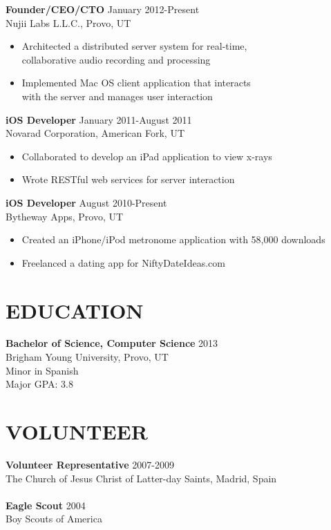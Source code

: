 \documentclass[margin]{res}
\begin{document}
\begin{resume}
      {\bf Founder/CEO/CTO} \hfill January 2012-Present \\
      Nujii Labs L.L.C., Provo, UT 
      \begin{itemize} \itemsep -2pt
          \item Architected a distributed server system for real-time, \\
          collaborative audio recording and processing
          \item Implemented Mac OS client application that interacts \\
          with the server and manages user interaction
      \end{itemize}

      {\bf iOS Developer} \hfill January 2011-August 2011 \\
      Novarad Corporation, American Fork, UT  
      \begin{itemize} \itemsep -2pt
          \item Collaborated to develop an iPad application to view x-rays
          \item Wrote RESTful web services for server interaction
      \end{itemize}

      {\bf iOS Developer} \hfill  August 2010-Present \\
      Bytheway Apps, Provo, UT
      \begin{itemize} \itemsep -2pt
          \item Created an iPhone/iPod metronome application with 58,000 downloads
          \item Freelanced a dating app for NiftyDateIdeas.com
      \end{itemize}

    \section{EDUCATION}
      {\bf Bachelor of Science, Computer Science} \hfill 2013 \\
      Brigham Young University, Provo, UT                 \\
      Minor in Spanish                                    \\
      Major GPA: 3.8

    \section{VOLUNTEER}
      {\bf Volunteer Representative} \hfill 2007-2009 \\
      The Church of Jesus Christ of Latter-day Saints, Madrid, Spain \\ \\
      {\bf Eagle Scout} \hfill 2004 \\
      Boy Scouts of America


\end{resume}
\end{document}
